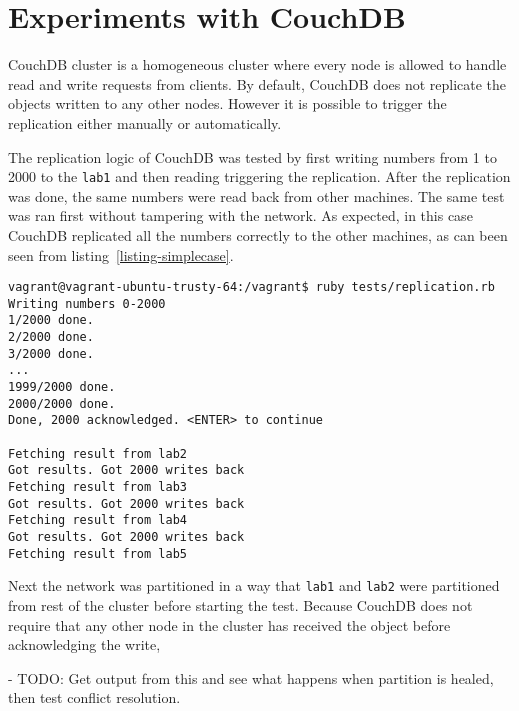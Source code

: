 \section{Experiments with CouchDB}

CouchDB cluster is a homogeneous cluster where every node is allowed to handle
read and write requests from clients. By default, CouchDB does not replicate the
objects written to any other nodes. However it is possible to trigger the
replication either manually or automatically.

The replication logic of CouchDB was tested by first writing numbers from 1 to
2000 to the \texttt{lab1} and then reading triggering the replication. After the
replication was done, the same numbers were read back from other machines. The
same test was ran first without tampering with the network. As expected, in this
case CouchDB replicated all the numbers correctly to the other machines, as can
been seen from listing~\ref{listing-simplecase}.

\begin{lstlisting}[caption={CouchDB replication without network anomalities},label={listing-simplecase}]
vagrant@vagrant-ubuntu-trusty-64:/vagrant$ ruby tests/replication.rb
Writing numbers 0-2000
1/2000 done.
2/2000 done.
3/2000 done.
...
1999/2000 done.
2000/2000 done.
Done, 2000 acknowledged. <ENTER> to continue

Fetching result from lab2
Got results. Got 2000 writes back
Fetching result from lab3
Got results. Got 2000 writes back
Fetching result from lab4
Got results. Got 2000 writes back
Fetching result from lab5
\end{lstlisting}

Next the network was partitioned in a way that \texttt{lab1} and \texttt{lab2}
were partitioned from rest of the cluster before starting the test. Because
CouchDB does not require that any other node in the cluster has received the
object before acknowledging the write, 

- TODO: Get output from this and see what happens when partition is healed, then
test conflict resolution.
